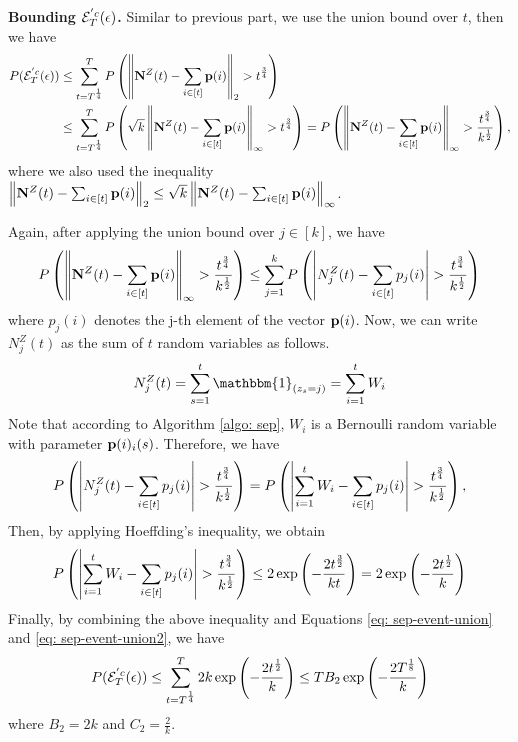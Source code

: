     
    \textbf{Bounding $\mathcal{E}^{'c}_T(\epsilon)$.} Similar to previous part, we use the union bound over $t$, then we have
    \begin{align}\label{eq: sep-event-union}
        P(\mathcal{E}^{'c}_T(\epsilon)) &\leq \sum_{t = T^{\frac14}}^{T} P\left( \left\Vert {\mathbf{N}^{Z}(t)} - {\sum_{i \in [t]} \mathbf{p}(i)} \right\Vert _{2} > t^{\frac34} \right) \nonumber \\
                                 &\leq \sum_{t = T^{\frac14}}^{T} P\left( \sqrt{k} \left\Vert {\mathbf{N}^{Z}(t)} - {\sum_{i \in [t]} \mathbf{p}(i)} \right\Vert _{\infty} > t^{\frac34} \right)  = P\left( \left\Vert {\mathbf{N}^{Z}(t)} - {\sum_{i \in [t]} \mathbf{p}(i)} \right\Vert _{\infty} > \frac{t^{\frac34}}{k^{\frac12}} \right),
    \end{align}
    where we also used the inequality $\left\Vert {\mathbf{N}^{Z}(t)} - {\sum_{i \in [t]} \mathbf{p}(i)} \right\Vert _{2} \leq  \sqrt{k} \left\Vert {\mathbf{N}^{Z}(t)} - {\sum_{i \in [t]} \mathbf{p}(i)} \right\Vert _{\infty}$.
     
    Again, after applying the union bound over $j \in [k]$, we have
    \begin{align}\label{eq: sep-event-union2}
        P\left( \left\Vert {\mathbf{N}^{Z}(t)} - {\sum_{i \in [t]} \mathbf{p}(i)} \right\Vert _{\infty} > \frac{t^{\frac34}}{k^{\frac12}} \right)  \leq \sum_{j = 1}^{k} P\left( \left \lvert N^{Z}_{j}(t) - {\sum_{i \in [t]} p_{j}(i)} \right \rvert > \frac{t^{\frac34}}{k^{\frac12}} \right)         
    \end{align}
    where $p_{j}(i)$ denotes the j-th element of the vector $\mathbf{p}(i)$. Now, we can write $N^{Z}_{j}(t)$ as the sum of $t$ random variables as follows.
    $$
           N^{Z}_j(t) = \sum_{s = 1}^{t} \mathbbm{1}_{(z_s = j)} = \sum_{i = 1}^{t} W_i
    $$
    Note that according to Algorithm \ref{algo: sep}, $W_i$ is a Bernoulli random variable with parameter $\mathbf{p}(i)_{i}(s)$. Therefore, we have
    $$
        P\left( \left \lvert N^Z_{j}(t) - {\sum_{i \in [t]} p_{j}(i)} \right \rvert > \frac{t^{\frac34}}{k^{\frac12}} \right)  = P\left( \left \lvert \sum_{i = 1}^{t} W_i - {\sum_{i \in [t]} p_{j}(i)} \right \rvert > \frac{t^{\frac34}}{k^{\frac12}} \right),
    $$
    Then, by applying Hoeffding's inequality, we obtain
    $$
        P\left( \left \lvert \sum_{i = 1}^{t} W_i - \sum_{i \in [t]} p_{j}(i) \right \rvert > \frac{t^{\frac34}}{k^{\frac12}} \right) \leq 2 \exp \left( - \frac{2t^{\frac32}}{kt} \right)  =   2 \exp \left( - \frac{2t^{\frac12}}{k} \right) 
    $$
    Finally, by combining the above inequality and Equations \eqref{eq: sep-event-union} and \eqref{eq: sep-event-union2}, we have
    $$
        P(\mathcal{E}^{'c}_T(\epsilon)) \leq \sum_{t = T^{\frac14}}^{T} 2k \exp \left( - \frac{2t^{\frac12}}{k} \right)
                                \leq TB_2 \exp \left( - \frac{2T^{\frac18}}{k} \right)
    $$
    where $B_2 = 2k$ and $C_2 = \frac{2}{k}$.

